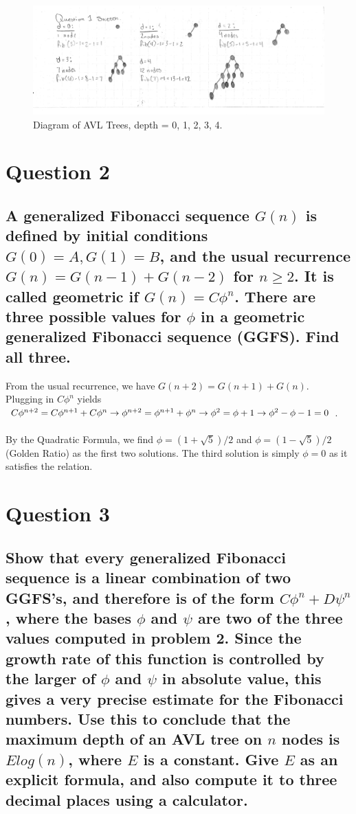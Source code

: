 \documentclass[11pt]{article}
\begin{document}
\begin{figure}
  \begin{flushleft}
    \includegraphics[width=1.5\textwidth]{q1.png}
  \end{flushleft}
  \caption{Diagram of AVL Trees, depth = 0, 1, 2, 3, 4.}
\end{figure}

\section{Question 2}
\subsection{A generalized Fibonacci sequence $ G(n) $ is defined by initial conditions $ G(0) = A, G(1) = B $, and the usual recurrence $ G(n) = G(n-1) + G(n-2) $ for $ n \geq 2 $.  It is called geometric if $ G(n) = C\phi^n$. There are three possible values for $ \phi $ in a geometric generalized Fibonacci sequence (GGFS). Find all three.}

From the usual recurrence, we have $ G(n+2) = G(n+1) + G(n) $. \\Plugging in $C\phi^n$ yields $ C\phi^{n+2} = C\phi^{n+1} + C\phi^n \rightarrow \phi^{n+2} = \phi^{n+1} + \phi^n \\\rightarrow \phi^2 = \phi + 1 \rightarrow \phi^2 - \phi - 1 = 0$. \\\\By the Quadratic Formula, we find $\phi = (1+\sqrt 5)/2 $ and $ \phi = (1-\sqrt 5)/2$ (Golden Ratio) as the first two solutions. The third solution is simply $\phi = 0$ as it satisfies the relation.

\section{Question 3}
\subsection{Show that every generalized Fibonacci sequence is a linear combination of two GGFS's, and therefore is of the form $ C\phi^n + D\psi^n$, where the bases $ \phi $ and $ \psi $ are two of the three values computed in problem 2. Since the growth rate of this function is controlled by the larger of $ \phi $ and $ \psi $ in absolute value, this gives a very precise estimate for the Fibonacci numbers. Use this to conclude that the maximum depth of an AVL tree on $ n $ nodes is $ Elog(n) $, where $ E $ is a constant.  Give $ E $ as an explicit formula, and also compute it to three decimal places using a calculator.}
\end{document}
